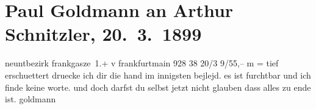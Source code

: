 

         
         \renewcommand{\erwaehntePersonen}{Personen: Paul Goldmann,  Ulrich}
         \renewcommand{\erwaehnteOrte}{Orte: Frankfurt am Main, Frankgasse, IX., Alsergrund, Wien}
         \renewcommand{\erwaehnteWerke}{}
               \section[Paul Goldmann an Arthur Schnitzler, 20. 3. 1899]{ Paul Goldmann an Arthur Schnitzler, 20. 3. 1899}\nopagebreak{}\rehead{ }\begin{ledgroupsized}[t]{13cm}\normalsize\beginnumbering{} \toendnotes[C]{\smallbreak\pagebreak[2]} 
\pstart{}{\pb}neuntbezirk frankgasze 1.+\pend{}{\bigskip}\pstart
           \noindent{}\centering{}{\pb}v frankfurtmain
               928 38 20/3{ }9/55,– m =\pend
           \pstart
           \noindent{}tief erschuettert druecke ich dir die hand im innigsten bejlejd. es ist furchtbar und
               ich finde keine worte. und doch darfst du selbst jetzt nicht glauben dass alles zu
               ende ist. \spacefill\mbox{goldmann}\pend
           
         
         \endnumbering{}\end{ledgroupsized}  \newcommand{\dateiname}{L02680}\newcommand{\titel}{Paul Goldmann an Arthur Schnitzler, 20. 3. 1899}\newcommand{\editorInnen}{Martin Anton Müller und Laura Untner}
      